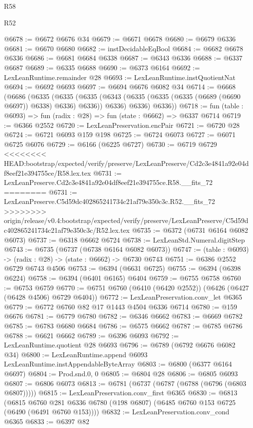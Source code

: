 \begin{lexlean}{R58}
\begin{lexlean}{R52}
\begin{coremodule}
{{{{{{{{{{{{{{{{{{{{{{{{{{{{{{{{{{{{{{{{{{{{{{{{{{{{{{{{{{{{{{{{{{{{{{{{{{{{{{{{{{{{{{{{{{{{{{{{{{{{{{{{{{{{{{{{{{{{{{{{{{{{{{{{{{{{{{{{{{{{{{{{{{{{{{{{{{{{{{{{{{{{{{{{{{{{{{{{{{{{{{{{{{{{{{{{{{{{{{@6678 := @6672 @6676 @34
@6679 := @6671 @6678
@6680 := @6679 @6336
@6681 := @6670 @6680
@6682 := instDecidableEqBool
@6684 := @6682 @6678 @6336
@6686 := @6681 @6684 @6338
@6687 := @6343 @6336
@6688 := @6337 @6687
@6689 := @6335 @6688
@6690 := @6373 @6164
@6692 := LexLeanRuntime.remainder @28
@6693 := LexLeanRuntime.instQuotientNat
@6694 := @6692 @6693
@6697 := @6694 @6676 @6082 @34
@6714 := @6668
    (@6686
      (@6335
        (@6335
          (@6335 (@6343 (@6335 (@6335 (@6335 (@6689 (@6690 @6697)) @6338) @6336) @6336)) @6336)
          @6336)
        @6336))
@6718 := fun (table : @6093) => fun (radix : @28) => fun (state : @6662) => @6337 @6714
@6719 := @6366 @2552
@6720 := LexLeanPreservation.encPair
@6721 := @6720 @28
@6724 := @6721 @6093 @159 @198
@6725 := @6724 @6073
@6727 := @6071 @6725 @6076
@6729 := @6166 (@6225 @6727)
@6730 := @6719 @6729
<<<<<<<< HEAD:bootstrap/expected/verify/preserve/LexLeanPreserve/Cd2c3e4841a92e04df8eef21e394755ce/R58.lex.tex
@6731 := LexLeanPreserve.Cd2c3e4841a92e04df8eef21e394755ce.R58.__fits_72
========
@6731 := LexLeanPreserve.C5d59dc402865241734c21af79e350c3c.R52.__fits_72
>>>>>>>> origin/release/v0.4:bootstrap/expected/verify/preserve/LexLeanPreserve/C5d59dc402865241734c21af79e350c3c/R52.lex.tex
@6735 := @6372 (@6731 @6164 @6082 @6073)
@6737 := @6318 @6662 @6724
@6738 := LexLeanStd.Numeral.digitStep
@6743 := @6735 (@6737 (@6738 @6164 @6082 @6073))
@6747 := (table : @6093) -> (radix : @28) -> (state : @6662) -> @6730 @6743
@6751 := @6386 @2552 @6729 @6743 @4506
@6753 := @6394 (@6631 @6725)
@6755 := @6394 (@6398 @6224)
@6758 := @6394 (@6401 @6165) @6404
@6759 := @6755 @6758
@6760 := @6753 @6759
@6770 := @6751 @6760 (@6410 (@6420 @2552)) (@6426 (@6427 (@6428 @4506) @6729 @6404))
@6772 := LexLeanPreservation.conv_let @6365
@6779 := @6772 @6760 @82 @17 @1443 @4504 @6336 @6714
@6780 := @159 @6676
@6781 := @6779 @6780
@6782 := @6346 @6662
@6783 := @6669 @6782
@6785 := @6783 @6680 @6684
@6786 := @6575 @6662
@6787 := @6785 @6786
@6788 := @6621 @6662
@6789 := @6396 @6093
@6792 := LexLeanRuntime.quotient @28 @6693
@6796 := @6789 (@6792 @6676 @6082 @34)
@6800 := LexLeanRuntime.append @6093 LexLeanRuntime.instAppendableByteArray
@6803 := @6800 (@6377 @6164 @6697)
@6804 := Prod.snd.{0, 0}
@6805 := @6804 @28
@6806 := @6805 @6093
@6807 := @6806 @6073
@6813 := @6781 (@6737 (@6787 (@6788 (@6796 (@6803 @6807)))))
@6815 := LexLeanPreservation.conv_first @6365
@6830 := @6813
    (@6815 @6760 @281 @6336 @6780 (@198 @6807) (@6485 @6760 @153 @6725 (@6490 (@6491 @6760 @153))))
@6832 := LexLeanPreservation.conv_cond @6365
@6833 := @6397 @82
}}}}}}}}}}}}}}}}}}}}}}}}}}}}}}}}}}}}}}}}}}}}}}}}}}}}}}}}}}}}}}}}}}}}}}}}}}}}}}}}}}}}}}}}}}}}}}}}}}}}}}}}}}}}}}}}}}}}}}}}}}}}}}}}}}}}}}}}}}}}}}}}}}}}}}}}}}}}}}}}}}}}}}}}}}}}}}}}}}}}}}}}}}}}}}}}}}}}}}
\end{coremodule}
\end{lexlean}
\end{lexlean}

